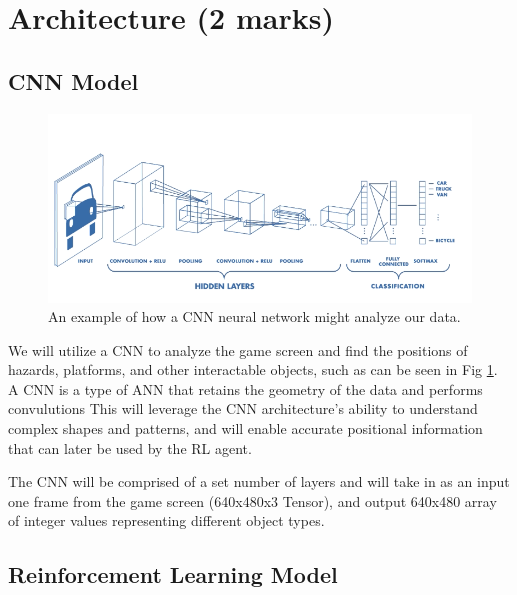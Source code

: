 \documentclass{article} %
\begin{document}
\section{Architecture (2 marks)}

\subsection{CNN Model}

\begin{figure}[!htbp]
\begin{center}
\includegraphics[width=1.0\textwidth]{Figs/CNN_sample_structure.png}
\end{center}
\caption{An example of how a CNN neural network might analyze our data.}
\label{fig:CNN_neural_network}
\end{figure}

We will utilize a CNN to analyze the game screen and find the positions of hazards, platforms, and other interactable objects, such as can be seen in Fig \ref{fig:CNN_neural_network}. A CNN is a type of ANN that retains the geometry of the data and performs convulutions  This will leverage the CNN architecture’s ability to understand complex shapes and patterns, and will enable accurate positional information that can later be used by the RL agent.

The CNN will be comprised of a set number of layers and will take in as an
input one frame from the game screen (640x480x3 Tensor), and output 
640x480 array of integer values representing different object types.
 

\subsection*{Reinforcement Learning Model}
\end{document}
